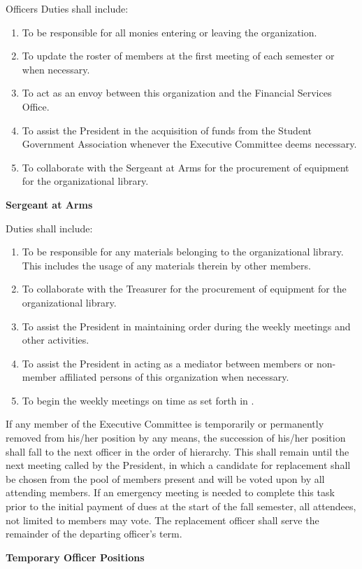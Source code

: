 {\begin{article}{Officers}
	Duties shall include:
	\begin{enumerate}
		\item To be responsible for all monies entering or leaving the organization.
		\item To update the roster of members at the first meeting of each semester or when necessary.
		\item To act as an envoy between this organization and the Financial Services Office.
		\item To assist the President in the acquisition of funds from the Student Government Association whenever the Executive Committee deems necessary.
		\item To collaborate with the Sergeant at Arms for the procurement of equipment for the organizational library.
	\end{enumerate}
	\item \textbf{Sergeant at Arms}

	Duties shall include:
	\begin{enumerate}
		\item To be responsible for any materials belonging to the organizational library. This includes the usage of any materials therein by other members.
		\item To collaborate with the Treasurer for the procurement of equipment for the organizational library.
		\item To assist the President in maintaining order during the weekly meetings and other activities.
		\item To assist the President in acting as a mediator between members or non-member affiliated persons of this organization when necessary.
		\item To begin the weekly meetings on time as set forth in .
	\end{enumerate}
	\item If any member of the Executive Committee is temporarily or permanently removed from his/her position by any means, the succession of his/her position shall fall to the next officer in the order of hierarchy.  This shall remain until the next meeting called by the President, in which a candidate for replacement shall be chosen from the pool of members present and will be voted upon by all attending members.  If an emergency meeting is needed to complete this task prior to the initial payment of dues at the start of the fall semester, all attendees, not limited to members may vote.  The replacement officer shall serve the remainder of the departing officer's term.
	\item \textbf{Temporary Officer Positions}


\end{article}}
